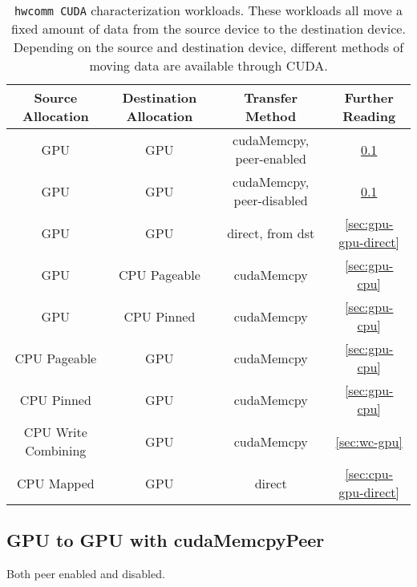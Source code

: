 \begin{table}[]
    \centering
    \caption[\texttt{hwcomm CUDA} characterization workloads]{
        \texttt{hwcomm CUDA} characterization workloads.
        These workloads all move a fixed amount of data from the source device to the destination device.
        Depending on the source and destination device, different methods of moving data are available through CUDA.
    }
    \label{tab:cuda workloads}
    \begin{tabular}{|c|c|c|c|}
    \hline
    \textbf{Source Allocation} & \textbf{Destination Allocation} & \textbf{Transfer Method} & \textbf{Further Reading} \\ \hline 
    GPU                 & GPU          & cudaMemcpy, peer-enabled  & \ref{sec:gpu-gpu-peer} \\ \hline
    GPU                 & GPU          & cudaMemcpy, peer-disabled & \ref{sec:gpu-gpu-peer} \\ \hline
    GPU                 & GPU          & direct, from dst          & \ref{sec:gpu-gpu-direct} \\ \hline
    GPU                 & CPU Pageable & cudaMemcpy                & \ref{sec:gpu-cpu} \\ \hline
    GPU                 & CPU Pinned   & cudaMemcpy                & \ref{sec:gpu-cpu} \\ \hline
    CPU Pageable        & GPU          & cudaMemcpy                & \ref{sec:gpu-cpu} \\ \hline
    CPU Pinned          & GPU          & cudaMemcpy                & \ref{sec:gpu-cpu} \\ \hline
    CPU Write Combining & GPU          & cudaMemcpy                & \ref{sec:wc-gpu} \\ \hline
    CPU Mapped          & GPU          & direct                    & \ref{sec:cpu-gpu-direct} \\ \hline
    \end{tabular}
\end{table}

\subsection{GPU to GPU with cudaMemcpyPeer}
\label{sec:gpu-gpu-peer}

Both peer enabled and disabled.






